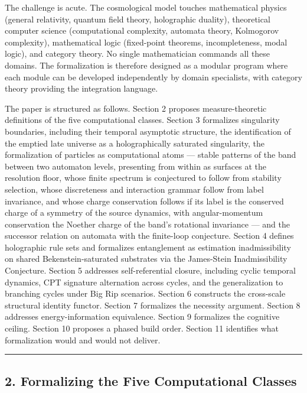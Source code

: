 \documentclass[
]{article}
\begin{document}
The challenge is acute. The cosmological model touches mathematical
physics (general relativity, quantum field theory, holographic duality),
theoretical computer science (computational complexity, automata theory,
Kolmogorov complexity), mathematical logic (fixed-point theorems,
incompleteness, modal logic), and category theory. No single
mathematician commands all these domains. The formalization is therefore
designed as a modular program where each module can be developed
independently by domain specialists, with category theory providing the
integration language.

The paper is structured as follows. Section 2 proposes measure-theoretic
definitions of the five computational classes. Section 3 formalizes
singularity boundaries, including their temporal asymptotic structure,
the identification of the emptied late universe as a holographically
saturated singularity, the formalization of particles as computational
atoms --- stable patterns of the band between two automaton levels,
presenting from within as surfaces at the resolution floor, whose finite
spectrum is conjectured to follow from stability selection, whose
discreteness and interaction grammar follow from label invariance, and
whose charge conservation follows if its label is the conserved charge
of a symmetry of the source dynamics, with angular-momentum conservation
the Noether charge of the band's rotational invariance --- and the
successor relation on automata with the finite-loop conjecture. Section
4 defines holographic rule sets and formalizes entanglement as
estimation inadmissibility on shared Bekenstein-saturated substrates via
the James-Stein Inadmissibility Conjecture. Section 5 addresses
self-referential closure, including cyclic temporal dynamics, CPT
signature alternation across cycles, and the generalization to branching
cycles under Big Rip scenarios. Section 6 constructs the cross-scale
structural identity functor. Section 7 formalizes the necessity
argument. Section 8 addresses energy-information equivalence. Section 9
formalizes the cognitive ceiling. Section 10 proposes a phased build
order. Section 11 identifies what formalization would and would not
deliver.

\begin{center}\rule{0.5\linewidth}{0.5pt}\end{center}

\hypertarget{formalizing-the-five-computational-classes}{%
\subsection{2. Formalizing the Five Computational
Classes}\label{formalizing-the-five-computational-classes}}
\end{document}
